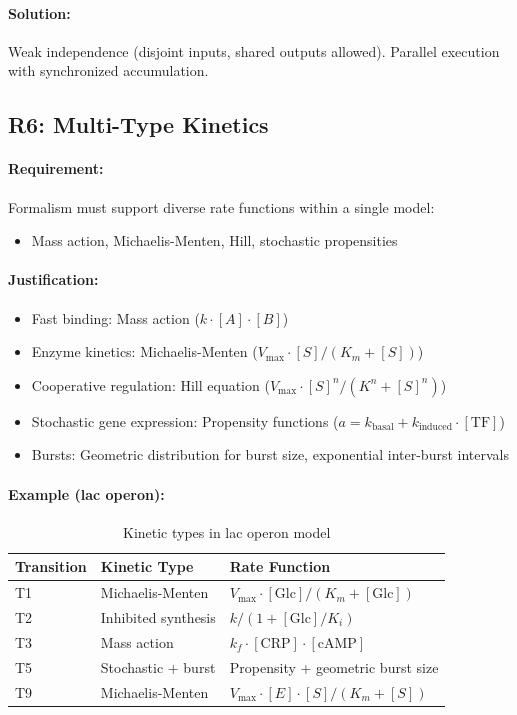 \paragraph{Solution:} Weak independence (disjoint inputs, shared outputs allowed). Parallel execution with synchronized accumulation.

\subsection{R6: Multi-Type Kinetics}
\label{subsec:r6-kinetics}

\paragraph{Requirement:} Formalism must support diverse rate functions within a single model:
\begin{itemize}
    \item Mass action, Michaelis-Menten, Hill, stochastic propensities
\end{itemize}

\paragraph{Justification:}
\begin{itemize}
    \item Fast binding: Mass action ($k \cdot [A] \cdot [B]$)
    \item Enzyme kinetics: Michaelis-Menten ($V_{\max} \cdot [S] / (K_m + [S])$)
    \item Cooperative regulation: Hill equation ($V_{\max} \cdot [S]^n / (K^n + [S]^n)$)
    \item Stochastic gene expression: Propensity functions ($a = k_{\text{basal}} + k_{\text{induced}} \cdot [\text{TF}]$)
    \item Bursts: Geometric distribution for burst size, exponential inter-burst intervals
\end{itemize}

\paragraph{Example (lac operon):}
\begin{table}[htbp]
\centering
\caption{Kinetic types in lac operon model}
\label{tab:lac-kinetics}
\begin{tabular}{llp{5cm}}
\toprule
\textbf{Transition} & \textbf{Kinetic Type} & \textbf{Rate Function} \\
\midrule
T1 & Michaelis-Menten & $V_{\max} \cdot [\text{Glc}] / (K_m + [\text{Glc}])$ \\
T2 & Inhibited synthesis & $k / (1 + [\text{Glc}]/K_i)$ \\
T3 & Mass action & $k_f \cdot [\text{CRP}] \cdot [\text{cAMP}]$ \\
T5 & Stochastic + burst & Propensity + geometric burst size \\
T9 & Michaelis-Menten & $V_{\max} \cdot [E] \cdot [S] / (K_m + [S])$ \\
\bottomrule
\end{tabular}
\end{table}

